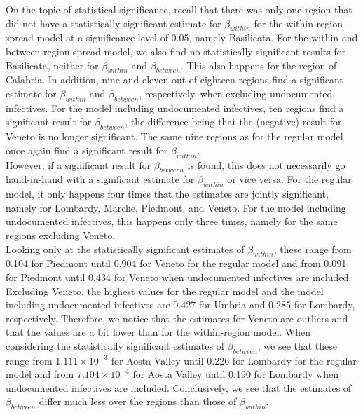 \documentclass[12pt]{article}
\begin{document}
	On the topic of statistical significance, recall that there was only one region that did not have a statistically significant estimate for $\beta_{within}$ for the within-region spread model at a significance level of 0.05, namely Basilicata. For the within and between-region spread model, we also find no statistically significant results for Basilicata, neither for $\beta_{within}$ and $\beta_{between}$. This also happens for the region of Calabria. In addition, nine and eleven out of eighteen regions find a significant estimate for $\beta_{within}$ and $\beta_{between}$, respectively, when excluding undocumented infectives. For the model including undocumented infectives, ten regions find a significant result for $\beta_{between}$, the difference being that the (negative) result for Veneto is no longer significant. The same nine regions as for the regular model once again find a significant result for $\beta_{within}$. \\
	
	However, if a significant result for $\beta_{between}$ is found, this does not necessarily go hand-in-hand with a significant estimate for $\beta_{within}$ or vice versa. For the regular model, it only happens four times that the estimates are jointly significant, namely for Lombardy, Marche, Piedmont, and Veneto. For the model including undocumented infectives, this happens only three times, namely for the same regions excluding Veneto. \\
	
	Looking only at the statistically significant estimates of $\beta_{within}$, these range from 0.104 for Piedmont until 0.904 for Veneto for the regular model and from 0.091 for Piedmont until 0.434 for Veneto when undocumented infectives are included. Excluding Veneto, the highest values for the regular model and the model including undocumented infectives are 0.427 for Umbria and 0.285 for Lombardy, respectively. Therefore, we notice that the estimates for Veneto are outliers and that the values are a bit lower than for the within-region model. When considering the statistically significant estimates of $\beta_{between}$, we see that these range from $1.111 \times 10^{-3}$ for Aosta Valley until 0.226 for Lombardy for the regular model and from $7.104 \times 10^{-4}$ for Aosta Valley until 0.190 for Lombardy when undocumented infectives are included. Conclusively, we see that the estimates of $\beta_{between}$ differ much less over the regions than those of $\beta_{within}$. \\
	
\end{document}
